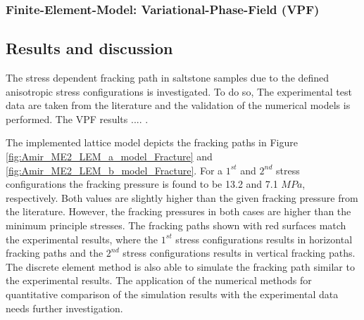 \subsubsection*{Finite-Element-Model: Variational-Phase-Field (VPF)}
\subsection{Results and discussion}

 The stress dependent fracking path in saltstone samples due to the defined anisotropic stress configurations is investigated. To do so,  The experimental test data are taken from the literature and the validation of the numerical models is performed. The VPF results .... 
 . 
 
 The implemented lattice model depicts the fracking paths in Figure  \ref{fig:Amir_ME2_LEM_a_model_Fracture} and \ref{fig:Amir_ME2_LEM_b_model_Fracture}. For a $1^{st}$ and $2^{nd}$ stress configurations the fracking pressure is found to be 13.2 and 7.1 $MPa$, respectively. Both values are slightly higher than the given fracking pressure from the literature. However, the fracking pressures in both cases are higher than the minimum principle stresses. The fracking paths shown with red surfaces match the experimental results, where the $1^{st}$ stress configurations results in horizontal fracking paths and the $2^{nd}$ stress configurations results in vertical fracking paths. The discrete element method is also able to simulate the fracking path similar to the experimental results. The application of the numerical methods for quantitative comparison of the simulation results with the experimental data needs further investigation. 


